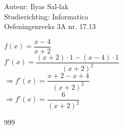 \documentclass[a4paper]{article}
\begin{document}
\noindent \large Auteur: Ilyas Sal-lak \\
\noindent \large Studierichting: Informatica\\
\noindent \large Oefeningenreeks 3A nr. 17.13\\

\medskip

\normalsize

$f(x) = \dfrac{x - 4}{x + 2}$ \\

$f'(x) = \dfrac{(x + 2) \cdot 1 - (x - 4) \cdot 1}{(x + 2)^2}$ \\

$\Rightarrow f'(x) = \dfrac{x + 2 - x + 4}{(x + 2)^2}$ \\

$\Rightarrow f'(x) = \dfrac{6}{(x + 2)^2}$

\begin{thebibliography}{999}
\end{thebibliography}
\end{document}
